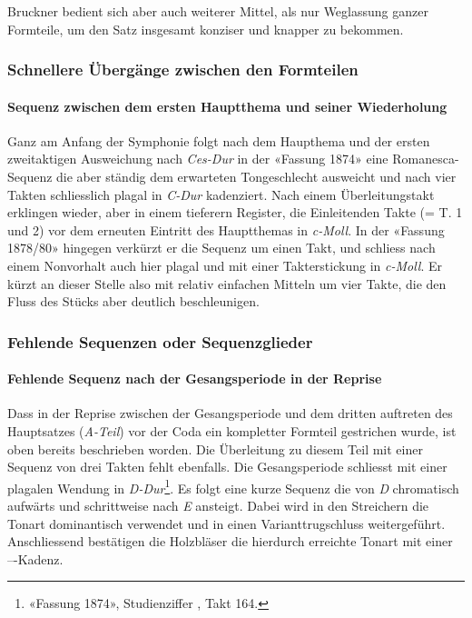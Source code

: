 Bruckner bedient sich aber auch weiterer Mittel, als nur Weglassung ganzer Formteile, um den Satz insgesamt konziser und knapper zu bekommen.

\subsubsection{Schnellere Übergänge zwischen den Formteilen}

\paragraph{Sequenz zwischen dem ersten Hauptthema und seiner Wiederholung}

Ganz am Anfang der Symphonie folgt nach dem Haupthema und der ersten zweitaktigen Ausweichung nach \emph{Ces-Dur} in der «Fassung 1874» eine Romanesca-Sequenz die aber ständig dem erwarteten Tongeschlecht ausweicht und nach vier Takten schliesslich plagal in \emph{C-Dur} kadenziert.
Nach einem Überleitungstakt erklingen wieder, aber in einem tieferern Register, die Einleitenden Takte (= T. 1 und 2) vor dem erneuten Eintritt des Hauptthemas in \emph{c-Moll}.
In der «Fassung 1878/80» hingegen verkürzt er die Sequenz um einen Takt, und schliess nach einem Nonvorhalt auch hier plagal und mit einer Takterstickung in \emph{c-Moll}.
Er kürzt an dieser Stelle also mit relativ einfachen Mitteln um vier Takte, die den Fluss des Stücks aber deutlich beschleunigen.


\subsubsection{Fehlende Sequenzen oder Sequenzglieder}

\paragraph{Fehlende Sequenz nach der Gesangsperiode in der Reprise}

Dass in der Reprise zwischen der Gesangsperiode und dem dritten auftreten des Hauptsatzes (\emph{A-Teil}) vor der Coda ein kompletter Formteil gestrichen wurde, ist oben bereits beschrieben worden.
Die Überleitung zu diesem Teil mit einer Sequenz von drei Takten fehlt ebenfalls.
Die Gesangsperiode schliesst mit einer plagalen Wendung in \emph{D-Dur}\footnote{«Fassung 1874», Studienziffer , Takt 164.}.
Es folgt eine kurze Sequenz die von \emph{D} chromatisch aufwärts und schrittweise nach \emph{E} ansteigt.
Dabei wird in den Streichern die Tonart dominantisch verwendet und in einen Varianttrugschluss weitergeführt.
Anschliessend bestätigen die Holzbläser die hierdurch erreichte Tonart mit einer ---Kadenz.

